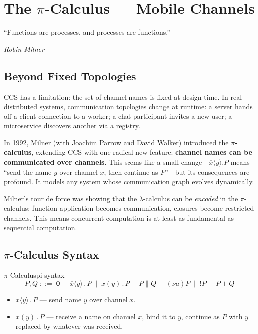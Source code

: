 \documentclass[11pt, a4paper, oneside]{book}
\newcommand{\nil}{\mathbf{0}}
\newcommand{\Par}{\mathbin{\|}}
\newcommand{\pref}{\mathbin{.}}
\newcommand{\res}[1]{(\nu #1)}
\newcommand{\repl}{\mathbin{!}}
\newcommand{\inp}[2]{#1(#2)}
\newcommand{\outp}[2]{\overline{#1}\langle #2 \rangle}
\begin{document}
\chapter{The $\pi$-Calculus --- Mobile Channels}

\epigraph{``Functions are processes, and processes are functions.''}%
{\textit{Robin Milner}}

\section{Beyond Fixed Topologies}

\begin{historical}[title={Milner, Parrow, and Walker (1992)}]
CCS has a limitation: the set of channel names is fixed at design time. In
real distributed systems, communication topologies change at runtime: a
server hands off a client connection to a worker; a chat participant invites
a new user; a microservice discovers another via a registry.

In 1992, Milner (with Joachim Parrow and David Walker) introduced the
\textbf{$\pi$-calculus}, extending CCS with one radical new feature:
\textbf{channel names can be communicated over channels}. This seems like a
small change---$\outp{x}{y}.P$ means ``send the name $y$ over channel $x$,
then continue as $P$''---but its consequences are profound. It models any
system whose communication graph evolves dynamically.

Milner's tour de force was showing that the $\lambda$-calculus can be
\emph{encoded} in the $\pi$-calculus: function application becomes
communication, closures become restricted channels. This means concurrent
computation is at least as fundamental as sequential computation.
\end{historical}

\section{$\pi$-Calculus Syntax}

\begin{defn}{$\pi$-Calculus}{pi-syntax}
\[
  P, Q \;::=\;
    \nil
    \;\mid\; \outp{x}{y} \pref P
    \;\mid\; \inp{x}{y} \pref P
    \;\mid\; P \Par Q
    \;\mid\; \res{a} P
    \;\mid\; \repl P
    \;\mid\; P + Q
\]
\begin{itemize}[nosep]
\item $\outp{x}{y} \pref P$ --- send name $y$ over channel $x$.
\item $\inp{x}{y} \pref P$ --- receive a name on channel $x$, bind it to $y$,
  continue as $P$ with $y$ replaced by whatever was received.
\end{itemize}
\end{defn}
\end{document}
